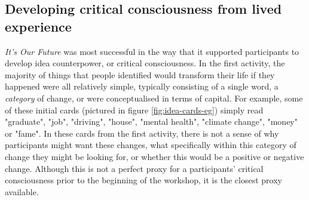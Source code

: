 \subsection{Developing critical consciousness from lived experience}
\textit{It's Our Future} was most successful in the way that it supported participants to develop idea counterpower, or critical consciousness. In the first activity, the majority of things that people identified would transform their life if they happened were all relatively simple, typically consisting of a single word, a \textit{category} of change, or were conceptualised in terms of capital. For example, some of these initial cards (pictured in figure \ref{fig:idea-cards-eg}) simply read "graduate", "job", "driving", "house", "mental health", "climate change", "money" or "fame". In these cards from the first activity, there is not a sense of why participants might want these changes, what specifically within this category of change they might be looking for, or whether this would be a positive or negative change. Although this is not a perfect proxy for a participants' critical consciousness prior to the beginning of the workshop, it is the closest proxy available. 


